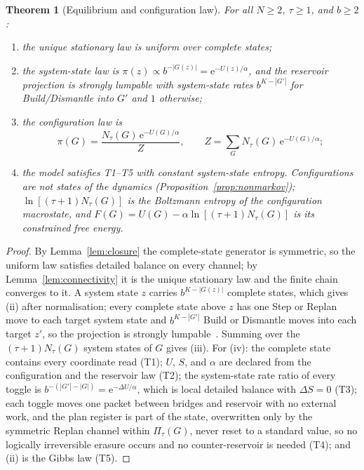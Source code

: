 \documentclass[aps,pre,preprint,superscriptaddress,nofootinbib]{revtex4-2}
\newtheorem{theorem}{Theorem}
\theoremstyle{definition}
\theoremstyle{remark}
\newcommand{\N}{N_\tau}
\newcommand{\Pl}{\Pi_\tau}
\newcommand{\e}{\mathrm{e}}
\begin{document}
\begin{theorem}[Equilibrium and configuration law]
\label{thm:equilibrium}
For all $N\ge2$, $\tau\ge1$, and $b\ge2$:
\begin{enumerate}
\item the unique stationary law is uniform over complete states;
\item the system-state law is $\pi(z)\propto b^{-|G(z)|}=\e^{-U(z)/\alpha}$, and the reservoir projection is strongly lumpable with system-state rates $b^{K-|G'|}$ for Build/Dismantle into $G'$ and $1$ otherwise;
\item the configuration law is
\begin{equation}
  \pi(G)=\frac{\N(G)\,\e^{-U(G)/\alpha}}{Z},\qquad Z=\sum_G \N(G)\,\e^{-U(G)/\alpha};
  \label{eq:law}
\end{equation}
\item the model satisfies T1--T5 with constant system-state entropy. Configurations are not states of the dynamics (Proposition~\ref{prop:nonmarkov}); $\ln[(\tau+1)\N(G)]$ is the Boltzmann entropy of the configuration macrostate, and $F(G)=U(G)-\alpha\ln[(\tau+1)\N(G)]$ is its constrained free energy.
\end{enumerate}
\end{theorem}
\begin{proof}
By Lemma~\ref{lem:closure} the complete-state generator is symmetric, so the uniform law satisfies detailed balance on every channel; by Lemma~\ref{lem:connectivity} it is the unique stationary law and the finite chain converges to it. A system state $z$ carries $b^{K-|G(z)|}$ complete states, which gives (ii) after normalisation; every complete state above $z$ has one Step or Replan move to each target system state and $b^{K-|G'|}$ Build or Dismantle moves into each target $z'$, so the projection is strongly lumpable~\cite{KemenySnell1960}. Summing over the $(\tau+1)\N(G)$ system states of $G$ gives (iii). For (iv): the complete state contains every coordinate read (T1); $U$, $S$, and $\alpha$ are declared from the configuration and the reservoir law (T2); the system-state rate ratio of every toggle is $b^{-(|G'|-|G|)}=\e^{-\Delta U/\alpha}$, which is local detailed balance with $\Delta S=0$ (T3); each toggle moves one packet between bridges and reservoir with no external work, and the plan register is part of the state, overwritten only by the symmetric Replan channel within $\Pl(G)$, never reset to a standard value, so no logically irreversible erasure occurs and no counter-reservoir is needed (T4); and (ii) is the Gibbs law (T5).
\end{proof}
\end{document}

